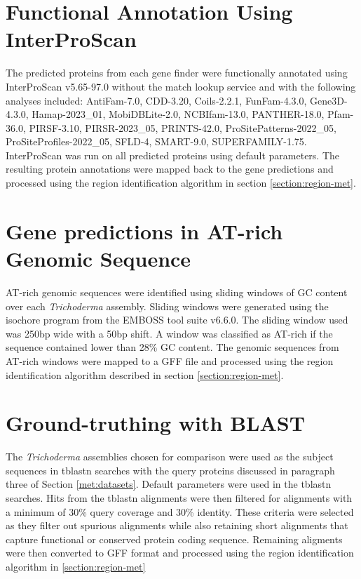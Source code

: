 \section{Functional Annotation Using InterProScan}

The predicted proteins from each gene finder were functionally
annotated using InterProScan
v5.65-97.0\cite{10.1093/bioinformatics/btu031} without the match
lookup service and with the following analyses included: AntiFam-7.0,
CDD-3.20, Coils-2.2.1, FunFam-4.3.0, Gene3D-4.3.0, Hamap-2023\_01,
MobiDBLite-2.0, NCBIfam-13.0, PANTHER-18.0, Pfam-36.0, PIRSF-3.10,
PIRSR-2023\_05, PRINTS-42.0, ProSitePatterns-2022\_05,
ProSiteProfiles-2022\_05, SFLD-4, SMART-9.0,
SUPERFAMILY-1.75. InterProScan was run on all predicted proteins using
default parameters. The resulting protein annotations were mapped back
to the gene predictions and processed using the region identification
algorithm in section \ref{section:region-met}.

\section{Gene predictions in AT-rich Genomic Sequence}

AT-rich genomic sequences were identified using sliding windows of GC
content over each \textit{Trichoderma} assembly. Sliding windows were
generated using the isochore program from the EMBOSS tool suite
v6.6.0\cite{Rice2000}. The sliding window used was 250bp wide with a
50bp shift. A window was classified as AT-rich if the sequence
contained lower than 28\% GC content. The genomic sequences from
AT-rich windows were mapped to a GFF file and processed using the
region identification algorithm described in section
\ref{section:region-met}.

\section{Ground-truthing with BLAST}

The \textit{Trichoderma} assemblies chosen for comparison were used as
the subject sequences in tblastn searches with the query proteins
discussed in paragraph three of Section \ref{met:datasets}. Default
parameters were used in the tblastn searches. Hits from the tblastn
alignments were then filtered for alignments with a minimum of 30\%
query coverage and 30\% identity. These criteria were selected as they
filter out spurious alignments while also retaining short alignments
that capture functional or conserved protein coding
sequence. Remaining aligments were then converted to GFF format and processed using the region identification algorithm in \ref{section:region-met}

